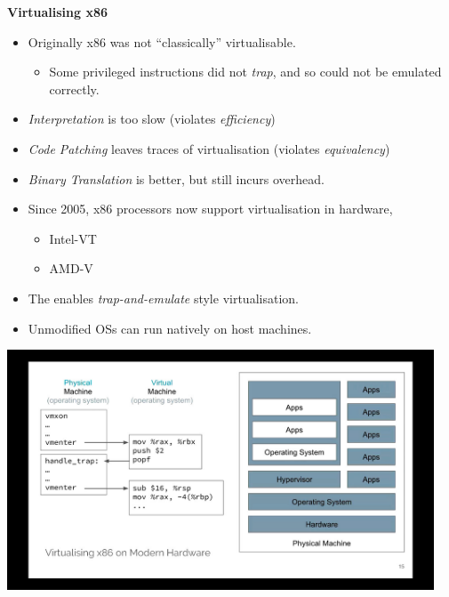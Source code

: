\documentclass[11pt,a4paper]{article}
\begin{document}
\textbf{Virtualising x86}
\begin{itemize}
    \item Originally x86 was not ``classically'' virtualisable.
        \begin{itemize}
            \item Some privileged instructions did not \emph{trap}, and so could not be
                emulated correctly.
        \end{itemize}
    \item \emph{Interpretation} is too slow (violates \emph{efficiency})
    \item \emph{Code Patching} leaves traces of virtualisation (violates \emph{equivalency})
    \item \emph{Binary Translation} is better, but still incurs overhead.
    \item Since 2005, x86 processors now support virtualisation in hardware,
        \begin{itemize}
            \item Intel-VT
            \item AMD-V
        \end{itemize}
    \item The enables \emph{trap-and-emulate} style virtualisation.
    \item Unmodified OSs can run natively on host machines.
\end{itemize}

\includegraphics[height=270]{virtualising-x86-on-modern-hardware.jpg}
\end{document}
